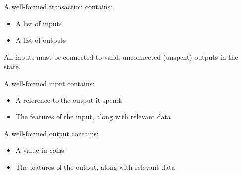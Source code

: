 A well-formed transaction contains:
\begin{itemize}
  \item A list of inputs
  \item A list of outputs
\end{itemize}
All inputs must be connected to valid, unconnected (unspent) outputs in the
state.

A well-formed input contains:
\begin{itemize}
  \item A reference to the output it spends
  \item The features of the input, along with relevant data
\end{itemize}

A well-formed output contains:
\begin{itemize}
  \item A value in coins
  \item The features of the output, along with relevant data
\end{itemize}

